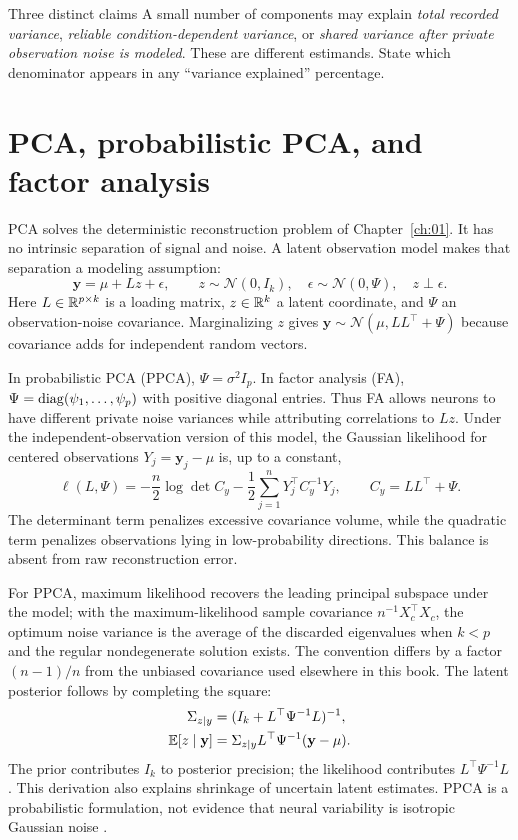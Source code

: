 \begin{insight}{Three distinct claims}
A small number of components may explain \emph{total recorded variance}, \emph{reliable condition-dependent variance}, or \emph{shared variance after private observation noise is modeled}. These are different estimands. State which denominator appears in any ``variance explained'' percentage.
\end{insight}

\section{PCA, probabilistic PCA, and factor analysis}
PCA solves the deterministic reconstruction problem of Chapter~\ref{ch:01}. It has no intrinsic separation of signal and noise. A latent observation model makes that separation a modeling assumption:
\begin{equation}
 \mathbf y=\mu+Lz+\epsilon,\qquad
 z\sim\mathcal N(0,I_k),\quad
 \epsilon\sim\mathcal N(0,\Psi),\quad z\perp\epsilon.
 \label{eq:06-fa}
\end{equation}
Here $L\in\mathbb{R}^{p\times k}$ is a loading matrix, $z\in\mathbb{R}^k$ a latent coordinate, and $\Psi$ an observation-noise covariance. Marginalizing $z$ gives $\mathbf y\sim\mathcal N(\mu,LL^\top+\Psi)$ because covariance adds for independent random vectors.

In probabilistic PCA (PPCA), $\Psi=\sigma^2I_p$. In factor analysis (FA), $\Psi=\operatorname{diag}(\psi_1,\ldots,\psi_p)$ with positive diagonal entries. Thus FA allows neurons to have different private noise variances while attributing correlations to $Lz$. Under the independent-observation version of this model, the Gaussian likelihood for centered observations $Y_j=\mathbf y_j-\mu$ is, up to a constant,
\begin{equation}
 \ell(L,\Psi)=-\frac n2\log\det C_y
              -\frac12\sum_{j=1}^nY_j^\top C_y^{-1}Y_j,
 \qquad C_y=LL^\top+\Psi.\label{eq:06-fa-likelihood}
\end{equation}
The determinant term penalizes excessive covariance volume, while the quadratic term penalizes observations lying in low-probability directions. This balance is absent from raw reconstruction error.

For PPCA, maximum likelihood recovers the leading principal subspace under the model; with the maximum-likelihood sample covariance $n^{-1}X_c^\top X_c$, the optimum noise variance is the average of the discarded eigenvalues when $k<p$ and the regular nondegenerate solution exists. The convention differs by a factor $(n-1)/n$ from the unbiased covariance used elsewhere in this book. The latent posterior follows by completing the square:
\begin{align}
 \Sigma_{z\mid y}&=(I_k+L^\top\Psi^{-1}L)^{-1},\\
 \mathbb{E}[z\mid\mathbf y]&=\Sigma_{z\mid y}L^\top\Psi^{-1}(\mathbf y-\mu).
 \label{eq:06-posterior}
\end{align}
The prior contributes $I_k$ to posterior precision; the likelihood contributes $L^\top\Psi^{-1}L$. This derivation also explains shrinkage of uncertain latent estimates. PPCA is a probabilistic formulation, not evidence that neural variability is isotropic Gaussian noise \citep{app_tipping1999}.

